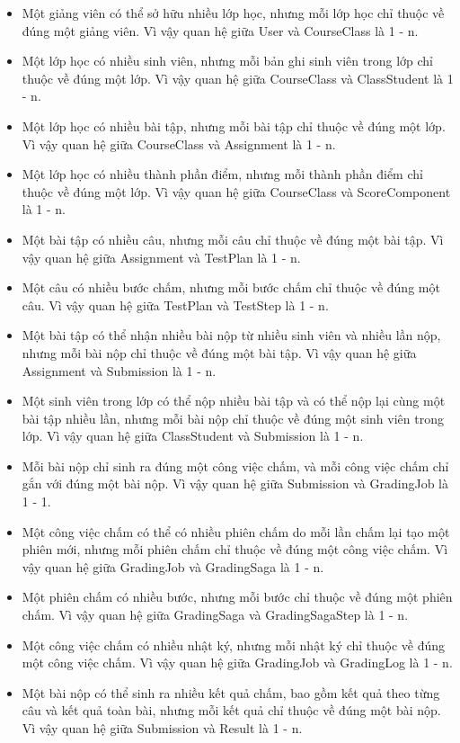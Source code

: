 \documentclass[../BTL.tex]{subfiles}
\begin{document}
\begin{itemize}[leftmargin=*, nosep]
    \item Một giảng viên có thể sở hữu nhiều lớp học, nhưng mỗi lớp học chỉ thuộc về đúng một giảng viên. Vì vậy quan hệ giữa User và CourseClass là 1 - n.
    \item Một lớp học có nhiều sinh viên, nhưng mỗi bản ghi sinh viên trong lớp chỉ thuộc về đúng một lớp. Vì vậy quan hệ giữa CourseClass và ClassStudent là 1 - n.
    \item Một lớp học có nhiều bài tập, nhưng mỗi bài tập chỉ thuộc về đúng một lớp. Vì vậy quan hệ giữa CourseClass và Assignment là 1 - n.
    \item Một lớp học có nhiều thành phần điểm, nhưng mỗi thành phần điểm chỉ thuộc về đúng một lớp. Vì vậy quan hệ giữa CourseClass và ScoreComponent là 1 - n.
    \item Một bài tập có nhiều câu, nhưng mỗi câu chỉ thuộc về đúng một bài tập. Vì vậy quan hệ giữa Assignment và TestPlan là 1 - n.
    \item Một câu có nhiều bước chấm, nhưng mỗi bước chấm chỉ thuộc về đúng một câu. Vì vậy quan hệ giữa TestPlan và TestStep là 1 - n.
    \item Một bài tập có thể nhận nhiều bài nộp từ nhiều sinh viên và nhiều lần nộp, nhưng mỗi bài nộp chỉ thuộc về đúng một bài tập. Vì vậy quan hệ giữa Assignment và Submission là 1 - n.
    \item Một sinh viên trong lớp có thể nộp nhiều bài tập và có thể nộp lại cùng một bài tập nhiều lần, nhưng mỗi bài nộp chỉ thuộc về đúng một sinh viên trong lớp. Vì vậy quan hệ giữa ClassStudent và Submission là 1 - n.
    \item Mỗi bài nộp chỉ sinh ra đúng một công việc chấm, và mỗi công việc chấm chỉ gắn với đúng một bài nộp. Vì vậy quan hệ giữa Submission và GradingJob là 1 - 1.
    \item Một công việc chấm có thể có nhiều phiên chấm do mỗi lần chấm lại tạo một phiên mới, nhưng mỗi phiên chấm chỉ thuộc về đúng một công việc chấm. Vì vậy quan hệ giữa GradingJob và GradingSaga là 1 - n.
    \item Một phiên chấm có nhiều bước, nhưng mỗi bước chỉ thuộc về đúng một phiên chấm. Vì vậy quan hệ giữa GradingSaga và GradingSagaStep là 1 - n.
    \item Một công việc chấm có nhiều nhật ký, nhưng mỗi nhật ký chỉ thuộc về đúng một công việc chấm. Vì vậy quan hệ giữa GradingJob và GradingLog là 1 - n.
    \item Một bài nộp có thể sinh ra nhiều kết quả chấm, bao gồm kết quả theo từng câu và kết quả toàn bài, nhưng mỗi kết quả chỉ thuộc về đúng một bài nộp. Vì vậy quan hệ giữa Submission và Result là 1 - n.

\end{itemize}
\end{document}
